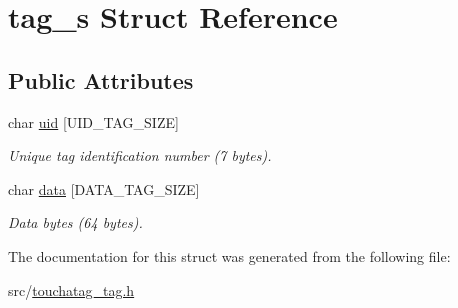 \hypertarget{structtag__s}{
\section{tag\_\-s Struct Reference}
\label{structtag__s}
}
\subsection*{Public Attributes}
\begin{DoxyCompactItemize}
\item 
\hypertarget{structtag__s_aa881d3a2d827a7617d7069e563c04751}{
char \hyperlink{structtag__s_aa881d3a2d827a7617d7069e563c04751}{uid} \mbox{[}UID\_\-TAG\_\-SIZE\mbox{]}}
\label{structtag__s_aa881d3a2d827a7617d7069e563c04751}

\begin{DoxyCompactList}\small\item\em Unique tag identification number (7 bytes). \item\end{DoxyCompactList}\item 
\hypertarget{structtag__s_a14f83ab1feeea67c0ba38f260b21e115}{
char \hyperlink{structtag__s_a14f83ab1feeea67c0ba38f260b21e115}{data} \mbox{[}DATA\_\-TAG\_\-SIZE\mbox{]}}
\label{structtag__s_a14f83ab1feeea67c0ba38f260b21e115}

\begin{DoxyCompactList}\small\item\em Data bytes (64 bytes). \item\end{DoxyCompactList}\end{DoxyCompactItemize}


The documentation for this struct was generated from the following file:\begin{DoxyCompactItemize}
\item 
src/\hyperlink{touchatag__tag_8h}{touchatag\_\-tag.h}\end{DoxyCompactItemize}
